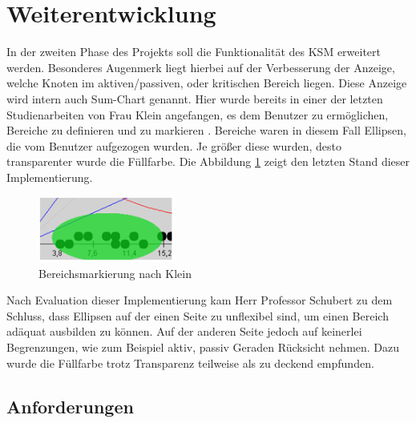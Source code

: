 \section{Weiterentwicklung}

In der zweiten Phase des Projekts soll die Funktionalität des KSM erweitert werden. Besonderes Augenmerk liegt hierbei auf der Verbesserung der Anzeige, welche Knoten im aktiven/passiven, oder kritischen Bereich liegen. Diese Anzeige wird intern auch Sum-Chart genannt. Hier wurde bereits in einer der letzten Studienarbeiten von Frau Klein angefangen, es dem Benutzer zu ermöglichen, Bereiche zu definieren und zu markieren \cite{bib:klein}. Bereiche waren in diesem Fall Ellipsen, die vom Benutzer aufgezogen wurden. Je größer diese wurden, desto transparenter wurde die Füllfarbe. Die Abbildung \ref{ellipse} zeigt den letzten Stand dieser Implementierung.
\begin{figure}[h]
	\centering
	\includegraphics[width=0.4\textwidth]{pictures/ellipse.png}
	\caption{Bereichsmarkierung nach Klein \cite{bib:klein}}
	\label{ellipse}
\end{figure}

Nach Evaluation dieser Implementierung kam Herr Professor Schubert zu dem Schluss, dass Ellipsen auf der einen Seite zu unflexibel sind, um einen Bereich adäquat ausbilden zu können. Auf der anderen Seite jedoch auf keinerlei Begrenzungen, wie zum Beispiel aktiv, passiv Geraden  Rücksicht nehmen. Dazu wurde die Füllfarbe trotz Transparenz teilweise als zu deckend empfunden.

\subsection{Anforderungen}


